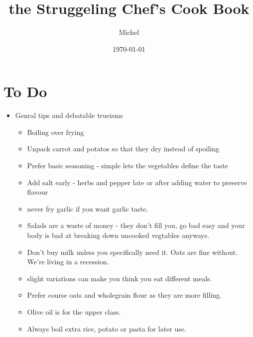 \documentclass[10pt]{book}
\title{\sc the Struggeling Chef's Cook Book}
\author{Michel}
\date{\today}
\begin{document}
\maketitle

\tableofcontents

\section{To Do}{
  \begin{itemize}
    \item Genral tips and debatable trueisms
      \begin{itemize}
        \item Boiling over frying
        \item Unpack carrot and potatos so that they dry instead of spoiling
        \item Prefer basic seasoning - simple lets the vegetables
          define the taste
        \item Add salt early - herbs and pepper late or after adding
          water to preserve flavour
        \item never fry garlic if you want garlic taste.
        \item Salads are a waste of money - they don't fill you, go bad easy and
          your body is bad at breaking down uncooked vegtables anyways.
        \item Don't buy milk unless you specifically need it. Oats
          are fine without. We're living in a recession.
        \item slight variations can make you think you eat different meals.
        \item Prefer course oats and wholegrain flour as they are more filling.
        \item Olive oil is for the upper class.
        \item Always boil extra rice, potato or pasta for later use.
      \end{itemize}


\end{itemize}}
\end{document}
